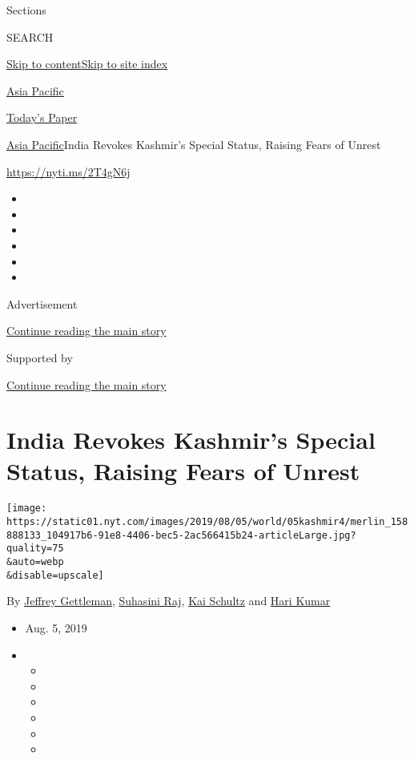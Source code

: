 Sections

SEARCH

\protect\hyperlink{site-content}{Skip to
content}\protect\hyperlink{site-index}{Skip to site index}

\href{https://www.nytimes.com/section/world/asia}{Asia Pacific}

\href{https://myaccount.nytimes.com/auth/login?response_type=cookie\&client_id=vi}{}

\href{https://www.nytimes.com/section/todayspaper}{Today's Paper}

\href{/section/world/asia}{Asia Pacific}\textbar{}India Revokes
Kashmir's Special Status, Raising Fears of Unrest

\url{https://nyti.ms/2T4gN6j}

\begin{itemize}
\item
\item
\item
\item
\item
\item
\end{itemize}

Advertisement

\protect\hyperlink{after-top}{Continue reading the main story}

Supported by

\protect\hyperlink{after-sponsor}{Continue reading the main story}

\hypertarget{india-revokes-kashmirs-special-status-raising-fears-of-unrest}{%
\section{India Revokes Kashmir's Special Status, Raising Fears of
Unrest}\label{india-revokes-kashmirs-special-status-raising-fears-of-unrest}}

\texttt{[image: https://static01.nyt.com/images/2019/08/05/world/05kashmir4/merlin\_158888133\_104917b6-91e8-4406-bec5-2ac566415b24-articleLarge.jpg?quality=75\\\&auto=webp\\\&disable=upscale]}

By \href{https://www.nytimes.com/by/jeffrey-gettleman}{Jeffrey
Gettleman}, \href{https://www.nytimes.com/by/suhasini-raj}{Suhasini
Raj}, \href{https://www.nytimes.com/by/kai-schultz}{Kai Schultz} and
\href{https://www.nytimes.com/by/hari-kumar}{Hari Kumar}

\begin{itemize}
\item
  Aug. 5, 2019
\item
  \begin{itemize}
  \item
  \item
  \item
  \item
  \item
  \item
  \end{itemize}
\end{itemize}

